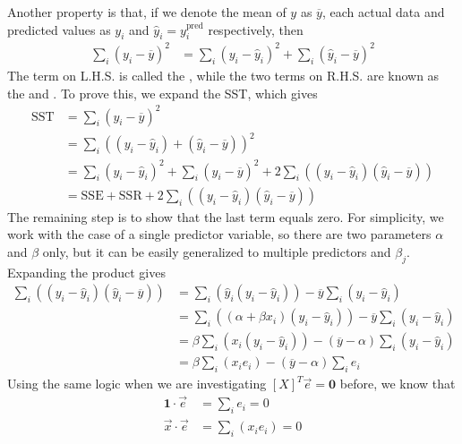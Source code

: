 Another property is that, if we denote the mean of $y$ as $\overline{y}$, each actual data and predicted values as $y_i$ and $\hat{y}_i = y^{\text{pred}}_i$ respectively, then
\begin{align}
\sum_i (y_i - \overline{y})^2 &= \sum_i (y_i - \hat{y}_i)^2 + \sum_i (\hat{y}_i - \overline{y})^2
\end{align}
The term on L.H.S. is called the , while the two terms on R.H.S. are known as the  and . To prove this, we expand the SST, which gives
\begin{align}
\text{SST} &= \sum_i (y_i - \overline{y})^2 \nonumber \\
&= \sum_i ((y_i - \hat{y}_i) + (\hat{y}_i - \overline{y}))^2 \nonumber \\
&= \sum_i (y_i - \hat{y}_i)^2 + \sum_i (\hat{y}_i - \overline{y})^2 + 2\sum_i ((y_i - \hat{y}_i) (\hat{y}_i - \overline{y})) \nonumber \\
&= \text{SSE} + \text{SSR} + 2\sum_i ((y_i - \hat{y}_i) (\hat{y}_i - \overline{y}))
\end{align}
The remaining step is to show that the last term equals zero. For simplicity, we work with the case of a single predictor variable, so there are two parameters $\alpha$ and $\beta$ only, but it can be easily generalized to multiple predictors and $\beta_j$. Expanding the product gives
\begin{align}
\sum_i ((y_i - \hat{y}_i) (\hat{y}_i - \overline{y})) &= \sum_i (\hat{y}_i(y_i - \hat{y}_i)) - \overline{y} \sum_i (y_i - \hat{y}_i) \nonumber \\
&= \sum_i ((\alpha + \beta x_i)(y_i - \hat{y}_i)) - \overline{y} \sum_i (y_i - \hat{y}_i) \nonumber \\
&= \beta \sum_i (x_i(y_i - \hat{y}_i)) - (\overline{y} - \alpha) \sum_i (y_i - \hat{y}_i) \nonumber \\
&= \beta \sum_i (x_i e_i) - (\overline{y} - \alpha) \sum_i e_i
\end{align}
Using the same logic when we are investigating $[X]^T\vec{e} = \textbf{0}$ before, we know that
\begin{subequations}
\begin{align}
\textbf{1} \cdot \vec{e} &= \sum_i e_i = 0 \\
\vec{x} \cdot \vec{e} &= \sum_i (x_i e_i) = 0
\end{align}    
\end{subequations}
